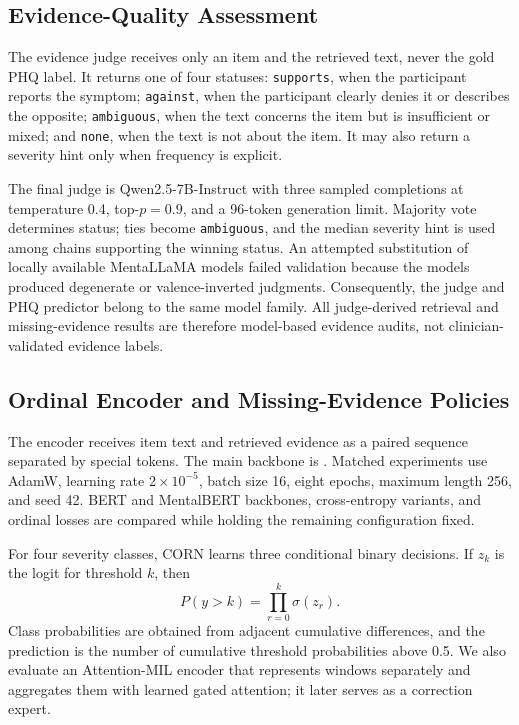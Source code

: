 \documentclass{article}
\begin{document}
\subsection{Evidence-Quality Assessment}
\label{subsec:judge}
The evidence judge receives only an item and the retrieved text, never the gold PHQ label. It returns one of four statuses: \texttt{supports}, when the participant reports the symptom; \texttt{against}, when the participant clearly denies it or describes the opposite; \texttt{ambiguous}, when the text concerns the item but is insufficient or mixed; and \texttt{none}, when the text is not about the item. It may also return a severity hint only when frequency is explicit.

The final judge is Qwen2.5-7B-Instruct with three sampled completions at temperature 0.4, top-$p=0.9$, and a 96-token generation limit. Majority vote determines status; ties become \texttt{ambiguous}, and the median severity hint is used among chains supporting the winning status. An attempted substitution of locally available MentaLLaMA models failed validation because the models produced degenerate or valence-inverted judgments. Consequently, the judge and PHQ predictor belong to the same model family. All judge-derived retrieval and missing-evidence results are therefore model-based evidence audits, not clinician-validated evidence labels.

\subsection{Ordinal Encoder and Missing-Evidence Policies}
\label{subsec:encoder}
The encoder receives item text and retrieved evidence as a paired sequence separated by special tokens. The main backbone is . Matched experiments use AdamW, learning rate $2\times10^{-5}$, batch size 16, eight epochs, maximum length 256, and seed 42. BERT and MentalBERT backbones, cross-entropy variants, and ordinal losses are compared while holding the remaining configuration fixed.

For four severity classes, CORN learns three conditional binary decisions. If $z_k$ is the logit for threshold $k$, then
\begin{equation}
 P(y>k)=\prod_{r=0}^{k}\sigma(z_r).
\end{equation}
Class probabilities are obtained from adjacent cumulative differences, and the prediction is the number of cumulative threshold probabilities above 0.5. We also evaluate an Attention-MIL encoder that represents windows separately and aggregates them with learned gated attention; it later serves as a correction expert.
\end{document}
